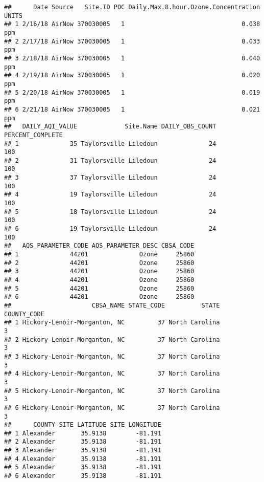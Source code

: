 \documentclass[]{article}
\newenvironment{Shaded}{\begin{snugshade}}{\end{snugshade}}
\newcommand{\KeywordTok}[1]{\textcolor[rgb]{0.13,0.29,0.53}{\textbf{#1}}}
\newcommand{\FloatTok}[1]{\textcolor[rgb]{0.00,0.00,0.81}{#1}}
\newcommand{\CommentTok}[1]{\textcolor[rgb]{0.56,0.35,0.01}{\textit{#1}}}
\newcommand{\OperatorTok}[1]{\textcolor[rgb]{0.81,0.36,0.00}{\textbf{#1}}}
\newcommand{\NormalTok}[1]{#1}
\begin{document}
\begin{verbatim}
##      Date Source   Site.ID POC Daily.Max.8.hour.Ozone.Concentration UNITS
## 1 2/16/18 AirNow 370030005   1                                0.038   ppm
## 2 2/17/18 AirNow 370030005   1                                0.033   ppm
## 3 2/18/18 AirNow 370030005   1                                0.040   ppm
## 4 2/19/18 AirNow 370030005   1                                0.020   ppm
## 5 2/20/18 AirNow 370030005   1                                0.019   ppm
## 6 2/21/18 AirNow 370030005   1                                0.021   ppm
##   DAILY_AQI_VALUE             Site.Name DAILY_OBS_COUNT PERCENT_COMPLETE
## 1              35 Taylorsville Liledoun              24              100
## 2              31 Taylorsville Liledoun              24              100
## 3              37 Taylorsville Liledoun              24              100
## 4              19 Taylorsville Liledoun              24              100
## 5              18 Taylorsville Liledoun              24              100
## 6              19 Taylorsville Liledoun              24              100
##   AQS_PARAMETER_CODE AQS_PARAMETER_DESC CBSA_CODE
## 1              44201              Ozone     25860
## 2              44201              Ozone     25860
## 3              44201              Ozone     25860
## 4              44201              Ozone     25860
## 5              44201              Ozone     25860
## 6              44201              Ozone     25860
##                      CBSA_NAME STATE_CODE          STATE COUNTY_CODE
## 1 Hickory-Lenoir-Morganton, NC         37 North Carolina           3
## 2 Hickory-Lenoir-Morganton, NC         37 North Carolina           3
## 3 Hickory-Lenoir-Morganton, NC         37 North Carolina           3
## 4 Hickory-Lenoir-Morganton, NC         37 North Carolina           3
## 5 Hickory-Lenoir-Morganton, NC         37 North Carolina           3
## 6 Hickory-Lenoir-Morganton, NC         37 North Carolina           3
##      COUNTY SITE_LATITUDE SITE_LONGITUDE
## 1 Alexander       35.9138        -81.191
## 2 Alexander       35.9138        -81.191
## 3 Alexander       35.9138        -81.191
## 4 Alexander       35.9138        -81.191
## 5 Alexander       35.9138        -81.191
## 6 Alexander       35.9138        -81.191
\end{verbatim}

\begin{Shaded}
\end{Shaded}
\end{document}
